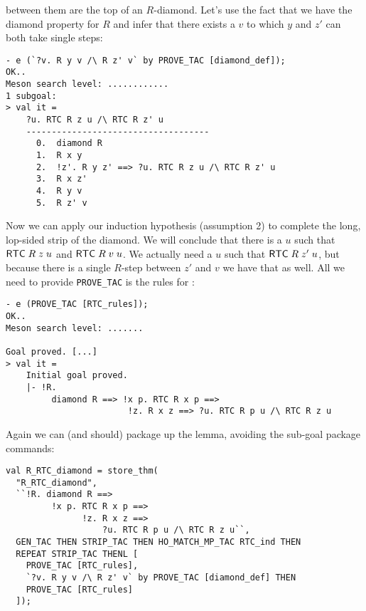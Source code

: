     between them are the top of an $R$-diamond.  Let's use the fact
    that we have the diamond property for $R$ and infer that there
    exists a $v$ to which $y$ and $z'$ can both take single steps:
\begin{session}
\begin{verbatim}
- e (`?v. R y v /\ R z' v` by PROVE_TAC [diamond_def]);
OK..
Meson search level: ............
1 subgoal:
> val it =
    ?u. RTC R z u /\ RTC R z' u
    ------------------------------------
      0.  diamond R
      1.  R x y
      2.  !z'. R y z' ==> ?u. RTC R z u /\ RTC R z' u
      3.  R x z'
      4.  R y v
      5.  R z' v
\end{verbatim}
\end{session}
Now we can apply our induction hypothesis (assumption 2) to complete
the long, lop-sided strip of the diamond.  We will conclude that there
is a $u$ such that ${\sf RTC}\;R\;z\;u$ and ${\sf RTC}\;R\;v\;u$.  We
actually need a $u$ such that ${\sf RTC}\;R\;z'\;u$, but because there
is a single $R$-step between $z'$ and $v$ we have that as well.  All
we need to provide \texttt{PROVE\_TAC} is the rules for :
\begin{session}
\begin{verbatim}
- e (PROVE_TAC [RTC_rules]);
OK..
Meson search level: .......

Goal proved. [...]
> val it =
    Initial goal proved.
    |- !R.
         diamond R ==> !x p. RTC R x p ==>
                        !z. R x z ==> ?u. RTC R p u /\ RTC R z u
\end{verbatim}
\end{session}
    Again we can (and should) package up the lemma, avoiding the
    sub-goal package commands:
\begin{session}
\begin{verbatim}
val R_RTC_diamond = store_thm(
  "R_RTC_diamond",
  ``!R. diamond R ==>
         !x p. RTC R x p ==>
               !z. R x z ==>
                   ?u. RTC R p u /\ RTC R z u``,
  GEN_TAC THEN STRIP_TAC THEN HO_MATCH_MP_TAC RTC_ind THEN
  REPEAT STRIP_TAC THENL [
    PROVE_TAC [RTC_rules],
    `?v. R y v /\ R z' v` by PROVE_TAC [diamond_def] THEN
    PROVE_TAC [RTC_rules]
  ]);
\end{verbatim}
\end{session}
\eos{}

